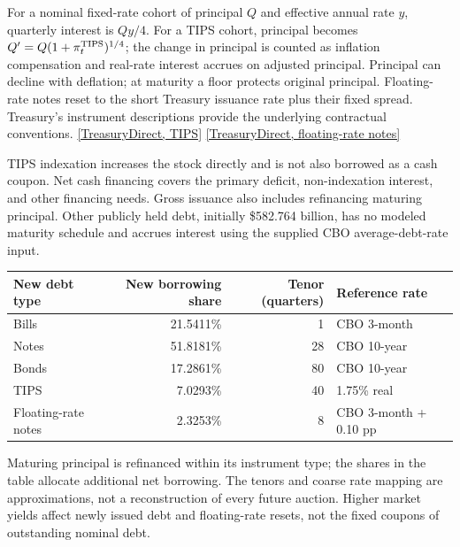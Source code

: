 \documentclass[11pt,letterpaper]{article}
\newcommand{\src}[2]{\href{#1}{#2}}
\begin{document}
For a nominal fixed-rate cohort of principal \(Q\) and effective annual rate
\(y\), quarterly interest is \(Qy/4\). For a TIPS cohort, principal becomes
\(Q'=Q(1+\pi^{\rm TIPS}_t)^{1/4}\); the change in principal is counted as
inflation compensation and real-rate interest accrues on adjusted principal.
Principal can decline with deflation; at maturity a floor protects original
principal. Floating-rate notes reset to the short Treasury issuance rate plus
their fixed spread. Treasury's instrument descriptions provide the underlying
contractual conventions.
\src{https://www.treasurydirect.gov/marketable-securities/tips/}{[TreasuryDirect, TIPS]}
\src{https://www.treasurydirect.gov/marketable-securities/floating-rate-notes/}
{[TreasuryDirect, floating-rate notes]}

TIPS indexation increases the stock directly and is not also borrowed as a
cash coupon. Net cash financing covers the primary deficit, non-indexation
interest, and other financing needs. Gross issuance also includes refinancing
maturing principal. Other publicly held debt, initially \$582.764 billion,
has no modeled maturity schedule and accrues interest using the supplied
CBO average-debt-rate input.

\begin{center}
\small
\begin{tabular}{@{}lrrl@{}}
\toprule
New debt type & New borrowing share & Tenor (quarters) & Reference rate\\
\midrule
Bills & 21.5411\% & 1 & CBO 3-month\\
Notes & 51.8181\% & 28 & CBO 10-year\\
Bonds & 17.2861\% & 80 & CBO 10-year\\
TIPS & 7.0293\% & 40 & 1.75\% real\\
Floating-rate notes & 2.3253\% & 8 & CBO 3-month + 0.10 pp\\
\bottomrule
\end{tabular}
\end{center}

Maturing principal is refinanced within its instrument type; the shares in
the table allocate additional net borrowing. The tenors and coarse rate
mapping are approximations, not a reconstruction of every future auction.
Higher market yields affect newly issued debt and floating-rate resets, not
the fixed coupons of outstanding nominal debt.
\end{document}
